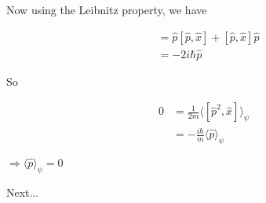 \documentclass[a4paper]{article}
\begin{document}
Now using the Leibnitz property, we have

\begin{align*}
[ \hat{p}^{2},\hat{x}] & =\hat{p} [ \hat{p},\hat{x}] + [ \hat{p},\hat{x}] \hat{p} \\
& = - 2 i \hbar \hat{p}
\end{align*} 

So

\begin{align*}
0 & = \frac{1}{2m} \langle [ \hat{p}^{2},\hat{x}] \rangle_{\psi} \\
& = - \frac{i \hbar}{m} \langle \hat{p} \rangle_{\psi}
\end{align*} 

$ \Rightarrow \langle \hat{p} \rangle_{\psi} = 0 $

Next...
\end{document}
